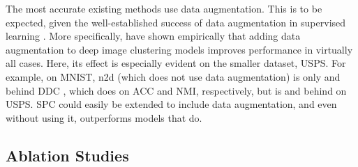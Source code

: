 \documentclass[runningheads]{llncs}
\begin{document}
The most accurate existing methods use data augmentation. This is to be expected, given the well-established success of data augmentation in supervised learning \cite{hinton2012improving}. More specifically, \cite{guo2018deep} have shown empirically that adding data augmentation to deep image clustering models improves performance in virtually all cases. Here, its effect is especially evident on the smaller dataset, USPS. For example, on MNIST, n2d \cite{mcconville2019n2d} (which does not use data augmentation) is only  and  behind DDC \cite{ren2020deep}, which does on ACC and NMI, respectively, but is  and  behind on USPS. SPC could easily be extended to include data augmentation, and even without using it, outperforms models that do.


\subsection{Ablation Studies}
\end{document}

